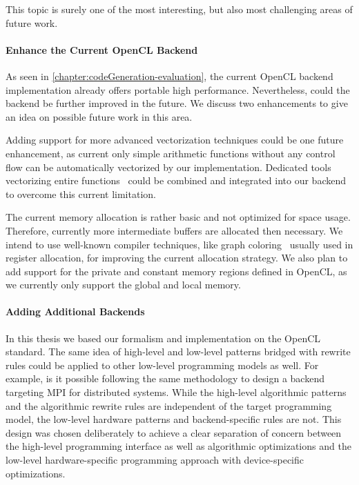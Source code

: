 \bigskip
This topic is surely one of the most interesting, but also most challenging areas of future work.

\paragraph{Enhance the Current OpenCL Backend}
As seen in \autoref{chapter:codeGeneration-evaluation}, the current OpenCL backend implementation already offers portable high performance.
Nevertheless, could the backend be further improved in the future.
We discuss two enhancements to give an idea on possible future work in this area.

Adding support for more advanced vectorization techniques could be one future enhancement, as current only simple arithmetic functions without any control flow can be automatically vectorized by our implementation.
Dedicated tools vectorizing entire functions~\cite{KarrenbergHa2011} could be combined and integrated into our backend to overcome this current limitation.

The current memory allocation is rather basic and not optimized for space usage.
Therefore, currently more intermediate buffers are allocated then necessary.
We intend to use well-known compiler techniques, like graph coloring~\cite{Muchnick1997} usually used in register allocation, for improving the current allocation strategy.
We also plan to add support for the private and constant memory regions defined in OpenCL, as we currently only support the global and local memory.

\paragraph{Adding Additional Backends}
In this thesis we based our formalism and implementation on the OpenCL standard.
The same idea of high-level and low-level patterns bridged with rewrite rules could be applied to other low-level programming models as well.
For example, is it possible following the same methodology to design a backend targeting MPI for distributed systems.
While the high-level algorithmic patterns and the algorithmic rewrite rules are independent of the target programming model, the low-level hardware patterns and  backend-specific rules are not.
This design was chosen deliberately to achieve a clear separation of concern between the high-level programming interface as well as algorithmic optimizations and the low-level hardware-specific programming approach with device-specific optimizations.


